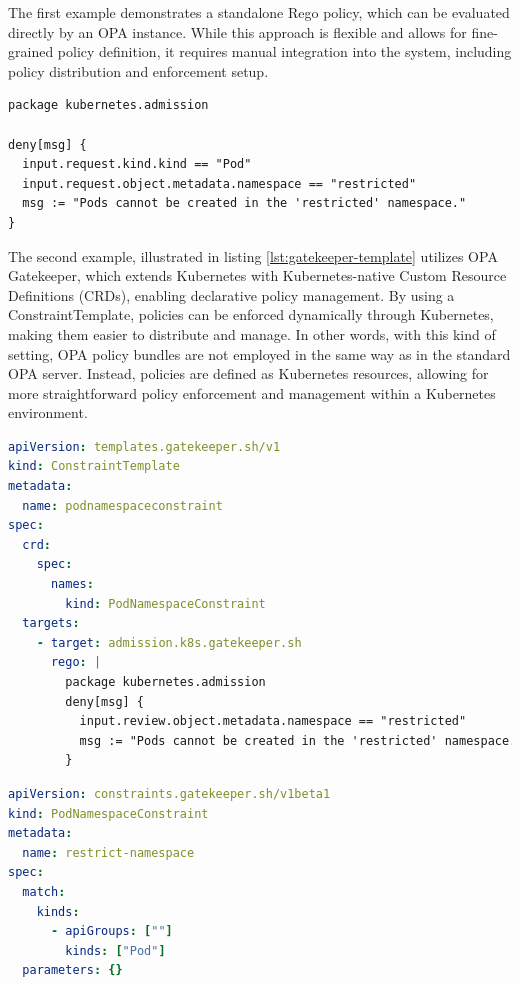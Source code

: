 The first example demonstrates a standalone Rego policy, which can be evaluated directly by an OPA instance. While this approach is flexible and allows for fine-grained policy definition, it requires manual integration into the system, including policy distribution and enforcement setup.  

\lstset{style=python}
\begin{lstlisting}[language=rego, caption={Simple OPA Rego Policy}, label={lst:opa-rego}]
package kubernetes.admission

deny[msg] {
  input.request.kind.kind == "Pod"
  input.request.object.metadata.namespace == "restricted"
  msg := "Pods cannot be created in the 'restricted' namespace."
}
\end{lstlisting}

The second example, illustrated in listing \ref{lst:gatekeeper-template} utilizes OPA Gatekeeper, which extends Kubernetes with Kubernetes-native Custom Resource Definitions (CRDs), enabling declarative policy management. By using a ConstraintTemplate, policies can be enforced dynamically through Kubernetes, making them easier to distribute and manage.
In other words, with this kind of setting, OPA policy bundles are not employed in the same way as in the standard OPA server. Instead, policies are defined as Kubernetes resources, allowing for more straightforward policy enforcement and management within a Kubernetes environment.

\begin{lstlisting}[language=yaml, caption={OPA Gatekeeper ConstraintTemplate}, label={lst:gatekeeper-template}]
apiVersion: templates.gatekeeper.sh/v1
kind: ConstraintTemplate
metadata:
  name: podnamespaceconstraint
spec:
  crd:
    spec:
      names:
        kind: PodNamespaceConstraint
  targets:
    - target: admission.k8s.gatekeeper.sh
      rego: |
        package kubernetes.admission
        deny[msg] {
          input.review.object.metadata.namespace == "restricted"
          msg := "Pods cannot be created in the 'restricted' namespace."
        }
\end{lstlisting}

\begin{lstlisting}[language=yaml, caption={OPA Gatekeeper Constraint}, label={lst:gatekeeper-constraint}, float=htpb]
apiVersion: constraints.gatekeeper.sh/v1beta1
kind: PodNamespaceConstraint
metadata:
  name: restrict-namespace
spec:
  match:
    kinds:
      - apiGroups: [""]
        kinds: ["Pod"]
  parameters: {}
\end{lstlisting}


